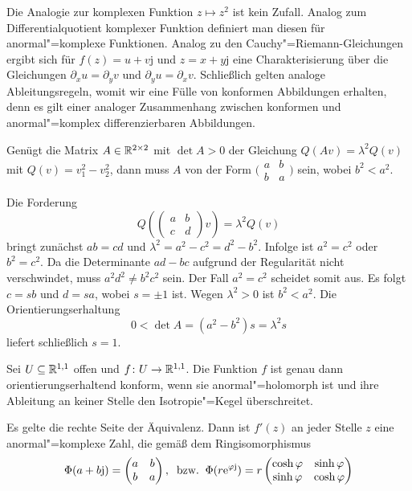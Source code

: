 Die Analogie zur komplexen Funktion $z\mapsto z^2$ ist kein Zufall.
Analog zum Differentialquotient komplexer Funktion definiert man diesen
für anormal"=komplexe Funktionen. Analog zu den
Cauchy"=Riemann-Gleichungen ergibt sich für $f(z)=u+v\mathrm{j}$ und
$z=x+y\mathrm{j}$ eine Charakterisierung über
die Gleichungen
$\partial_x u=\partial_y v$ und $\partial_y u = \partial_x v$.
Schließlich gelten analoge Ableitungsregeln, womit wir eine Fülle
von konformen Abbildungen erhalten, denn es gilt einer analoger
Zusammenhang zwischen konformen und anormal"=komplex differenzierbaren
Abbildungen.
\begin{lemma}\label{konforme-Matrix-2x2}
Genügt die Matrix $A\in\mathbb R^{2\times 2}$ mit $\det A>0$ der
Gleichung $Q(Av)=\lambda^2 Q(v)$ mit $Q(v)=v_1^2-v_2^2$, dann muss $A$
von der Form $\big(\begin{smallmatrix}a & b\\ b & a\end{smallmatrix}\big)$
sein, wobei $b^2<a^2$.
\end{lemma}
 Die Forderung
\begin{equation}
Q(\begin{pmatrix}a & b\\ c & d\end{pmatrix}v) = \lambda^2 Q(v)
\end{equation}
bringt zunächst $ab=cd$ und $\lambda^2 = a^2-c^2 = d^2-b^2$. Infolge ist
$a^2=c^2$ oder $b^2=c^2$. Da die Determinante $ad-bc$ aufgrund der
Regularität nicht verschwindet, muss $a^2d^2\ne b^2c^2$ sein. Der Fall
$a^2=c^2$ scheidet somit aus. Es folgt $c=sb$ und $d=sa$, wobei
$s=\pm 1$ ist. Wegen $\lambda^2>0$ ist $b^2<a^2$. Die
Orientierungserhaltung
\begin{equation}
0 < \det A = (a^2-b^2)s = \lambda^2 s
\end{equation}
liefert schließlich $s=1$.\;\qedsymbol
\begin{corollary}
Sei $U\subseteq\mathbb R^{1,1}$ offen und
$f\colon U\to\mathbb R^{1,1}$. Die Funktion $f$ ist genau dann orientierungserhaltend
konform, wenn sie anormal"=holomorph ist und ihre Ableitung an keiner
Stelle den Isotropie"=Kegel überschreitet.
\end{corollary}
 Es gelte die rechte Seite der Äquivalenz. Dann ist
$f'(z)$ an jeder Stelle $z$ eine anormal"=komplexe Zahl,
die gemäß dem Ringisomorphismus
\begin{equation}
\Phi(a+b\mathrm j) = \begin{pmatrix} a & b\\ b & a\end{pmatrix},
\;\;\text{bzw.}\;\;
\Phi(r\mathrm e^{\varphi\mathrm j}) = r\begin{pmatrix}\cosh\varphi & \sinh\varphi\\
\sinh\varphi & \cosh\varphi\end{pmatrix}
\end{equation}
